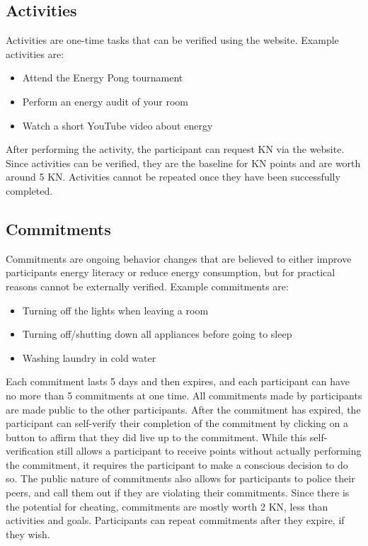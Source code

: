 \subsection{Activities}

Activities are one-time tasks that can be verified using the website. Example activities are:

\begin{itemize}
	\item Attend the Energy Pong tournament
	\item Perform an energy audit of your room
	\item Watch a short YouTube video about energy
\end{itemize}

After performing the activity, the participant can request KN via the website. Since activities can be verified, they are the baseline for KN points and are worth around 5 KN. Activities cannot be repeated once they have been successfully completed.

\subsection{Commitments}

Commitments are ongoing behavior changes that are believed to either improve participants energy literacy or reduce energy consumption, but for practical reasons cannot be externally verified. Example commitments are:

\begin{itemize}
	\item Turning off the lights when leaving a room
	\item Turning off/shutting down all appliances before going to sleep
	\item Washing laundry in cold water
\end{itemize}

Each commitment lasts 5 days and then expires, and each participant can have no more than 5 commitments at one time. All commitments made by participants are made public to the other participants. After the commitment has expired, the participant can self-verify their completion of the commitment by clicking on a button to affirm that they did live up to the commitment. While this self-verification still allows a participant to receive points without actually performing the commitment, it requires the participant to make a conscious decision to do so. The public nature of commitments also allows for participants to police their peers, and call them out if they are violating their commitments. Since there is the potential for cheating, commitments are mostly worth 2 KN, less than activities and goals. Participants can repeat commitments after they expire, if they wish.
	
